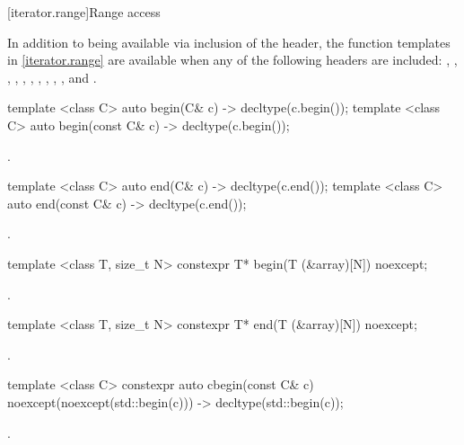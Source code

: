[iterator.range]{Range access}

{\color{remclr}
\pnum
In addition to being available via inclusion of the  header,
the function templates in \ref{iterator.range} are available when any of the following
headers are included: , , ,
, , , , ,
, , and .
}

{\color{remclr}
%
\begin{itemdecl}
template <class C> auto begin(C& c) -> decltype(c.begin());
template <class C> auto begin(const C& c) -> decltype(c.begin());
\end{itemdecl}

\begin{itemdescr}
\pnum
\returns {}.
\end{itemdescr}

%
\begin{itemdecl}
template <class C> auto end(C& c) -> decltype(c.end());
template <class C> auto end(const C& c) -> decltype(c.end());
\end{itemdecl}

\begin{itemdescr}
\pnum
\returns {}.
\end{itemdescr}

%
\begin{itemdecl}
template <class T, size_t N> constexpr T* begin(T (&array)[N]) noexcept;
\end{itemdecl}

\begin{itemdescr}
\pnum
\returns {}.
\end{itemdescr}

%
\begin{itemdecl}
template <class T, size_t N> constexpr T* end(T (&array)[N]) noexcept;
\end{itemdecl}

\begin{itemdescr}
\pnum
\returns {}.
\end{itemdescr}

%
\begin{itemdecl}
template <class C> constexpr auto cbegin(const C& c) noexcept(noexcept(std::begin(c)))
  -> decltype(std::begin(c));
\end{itemdecl}
\begin{itemdescr}
\pnum \returns {}.
\end{itemdescr}

}
